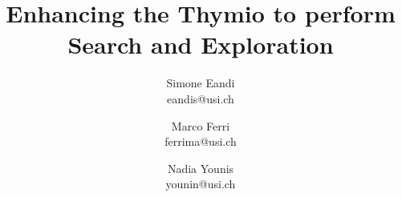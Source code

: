 \documentclass[9pt,conference]{IEEEtran}
\begin{document}

\title{Enhancing the Thymio to perform Search and Exploration} 

\author{
    Simone Eandi \\
    eandis@usi.ch
	\and
	Marco Ferri \\
	ferrima@usi.ch
	\and 
	Nadia Younis \\
	younin@usi.ch
}

\maketitle


% 








\maketitle
\end{document}

